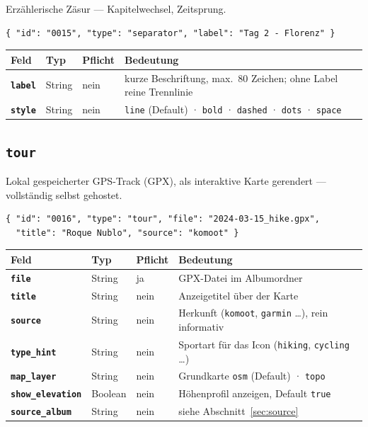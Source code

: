 \documentclass[11pt,a4paper]{article}
\let\mpdtt\texttt
\renewcommand{\texttt}[1]{\mpdtt{\textcolor{mpdred}{#1}}}
\newcommand{\feld}[1]{\mpdtt{\textbf{\textcolor{mpdred}{#1}}}}
\newcommand{\kopf}[1]{\textbf{#1}}
\begin{document}
Erzählerische Zäsur — Kapitelwechsel, Zeitsprung.

\begin{lstlisting}
{ "id": "0015", "type": "separator", "label": "Tag 2 - Florenz" }
\end{lstlisting}

\begin{tabularx}{\linewidth}{|l|l|l|L|}
\hline
{}\kopf{Feld} & \kopf{Typ} & \kopf{Pflicht} & \kopf{Bedeutung} \\
\hline
\feld{label} & String & nein & kurze Beschriftung, max.\ 80 Zeichen; ohne Label reine Trennlinie \\
\feld{style} & String & nein & \texttt{line} (Default) · \texttt{bold} · \texttt{dashed} · \texttt{dots} · \texttt{space} \\
\hline
\end{tabularx}

\subsection{\texttt{tour}}

Lokal gespeicherter GPS-Track (GPX), als interaktive Karte gerendert —
vollständig selbst gehostet.

\begin{lstlisting}
{ "id": "0016", "type": "tour", "file": "2024-03-15_hike.gpx",
  "title": "Roque Nublo", "source": "komoot" }
\end{lstlisting}

\begin{tabularx}{\linewidth}{|l|l|l|L|}
\hline
{}\kopf{Feld} & \kopf{Typ} & \kopf{Pflicht} & \kopf{Bedeutung} \\
\hline
\feld{file} & String & ja & GPX-Datei im Albumordner \\
\feld{title} & String & nein & Anzeigetitel über der Karte \\
\feld{source} & String & nein & Herkunft (\texttt{komoot}, \texttt{garmin} …), rein informativ \\
\feld{type\_hint} & String & nein & Sportart für das Icon (\texttt{hiking}, \texttt{cycling} …) \\
\feld{map\_layer} & String & nein & Grundkarte \texttt{osm} (Default) · \texttt{topo} \\
\feld{show\_elevation} & Boolean & nein & Höhenprofil anzeigen, Default \texttt{true} \\
\feld{source\_album} & String & nein & siehe Abschnitt~\ref{sec:source} \\
\hline
\end{tabularx}
\end{document}
